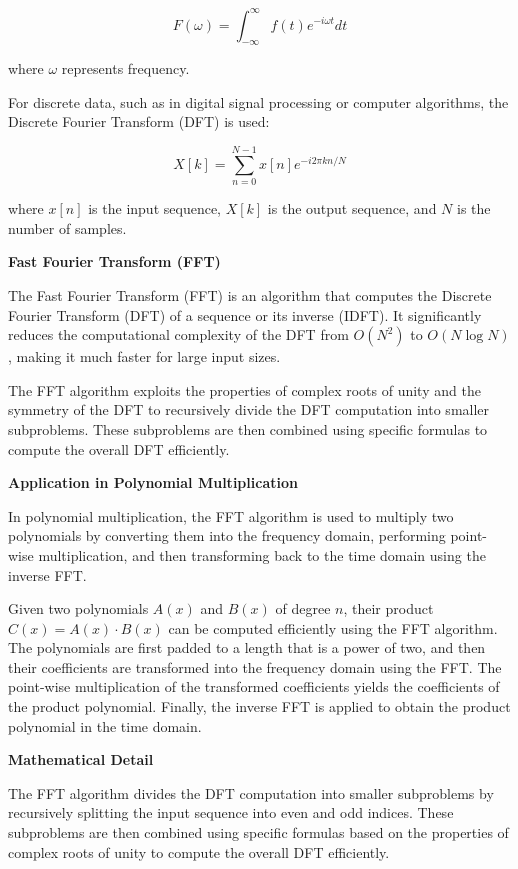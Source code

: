 \documentclass[12pt]{book} %
\begin{document}
\[
F(\omega) = \int_{-\infty}^{\infty} f(t) e^{-i\omega t} dt
\]

where \( \omega \) represents frequency.

For discrete data, such as in digital signal processing or computer algorithms, the Discrete Fourier Transform (DFT) is used:

\[
X[k] = \sum_{n=0}^{N-1} x[n] e^{-i 2 \pi k n / N}
\]

where \( x[n] \) is the input sequence, \( X[k] \) is the output sequence, and \( N \) is the number of samples.

\textbf{Fast Fourier Transform (FFT)}

The Fast Fourier Transform (FFT) is an algorithm that computes the Discrete Fourier Transform (DFT) of a sequence or its inverse (IDFT). It significantly reduces the computational complexity of the DFT from \( O(N^2) \) to \( O(N \log N) \), making it much faster for large input sizes.

The FFT algorithm exploits the properties of complex roots of unity and the symmetry of the DFT to recursively divide the DFT computation into smaller subproblems. These subproblems are then combined using specific formulas to compute the overall DFT efficiently.

\textbf{Application in Polynomial Multiplication}

In polynomial multiplication, the FFT algorithm is used to multiply two polynomials by converting them into the frequency domain, performing point-wise multiplication, and then transforming back to the time domain using the inverse FFT.

Given two polynomials \( A(x) \) and \( B(x) \) of degree \( n \), their product \( C(x) = A(x) \cdot B(x) \) can be computed efficiently using the FFT algorithm. The polynomials are first padded to a length that is a power of two, and then their coefficients are transformed into the frequency domain using the FFT. The point-wise multiplication of the transformed coefficients yields the coefficients of the product polynomial. Finally, the inverse FFT is applied to obtain the product polynomial in the time domain.

\textbf{Mathematical Detail}

The FFT algorithm divides the DFT computation into smaller subproblems by recursively splitting the input sequence into even and odd indices. These subproblems are then combined using specific formulas based on the properties of complex roots of unity to compute the overall DFT efficiently.
\end{document}
